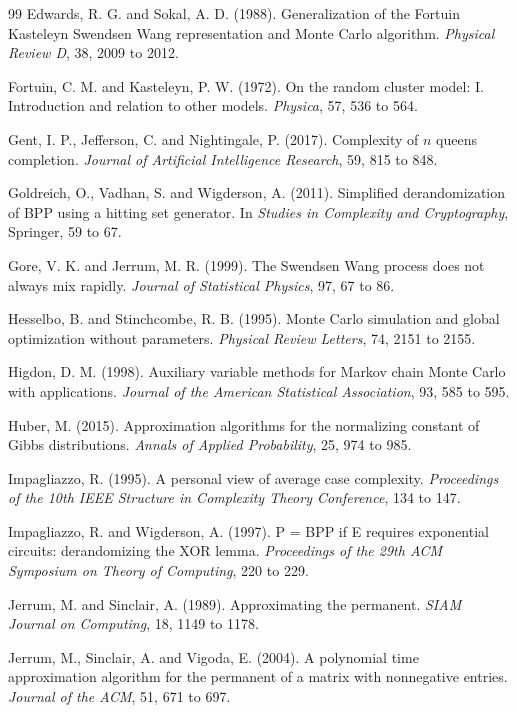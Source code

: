 \documentclass[11pt,twoside,openany]{book}
\theoremstyle{plain}
\theoremstyle{definition}
\theoremstyle{remark}
\begin{document}
\begin{thebibliography}{99}
 Edwards, R. G. and Sokal, A. D. (1988). Generalization of the Fortuin Kasteleyn Swendsen Wang representation and Monte Carlo algorithm. \emph{Physical Review D}, 38, 2009 to 2012.

 Fortuin, C. M. and Kasteleyn, P. W. (1972). On the random cluster model: I. Introduction and relation to other models. \emph{Physica}, 57, 536 to 564.

 Gent, I. P., Jefferson, C. and Nightingale, P. (2017). Complexity of $n$ queens completion. \emph{Journal of Artificial Intelligence Research}, 59, 815 to 848.

 Goldreich, O., Vadhan, S. and Wigderson, A. (2011). Simplified derandomization of BPP using a hitting set generator. In \emph{Studies in Complexity and Cryptography}, Springer, 59 to 67.

 Gore, V. K. and Jerrum, M. R. (1999). The Swendsen Wang process does not always mix rapidly. \emph{Journal of Statistical Physics}, 97, 67 to 86.

 Hesselbo, B. and Stinchcombe, R. B. (1995). Monte Carlo simulation and global optimization without parameters. \emph{Physical Review Letters}, 74, 2151 to 2155.

 Higdon, D. M. (1998). Auxiliary variable methods for Markov chain Monte Carlo with applications. \emph{Journal of the American Statistical Association}, 93, 585 to 595.

 Huber, M. (2015). Approximation algorithms for the normalizing constant of Gibbs distributions. \emph{Annals of Applied Probability}, 25, 974 to 985.

 Impagliazzo, R. (1995). A personal view of average case complexity. \emph{Proceedings of the 10th IEEE Structure in Complexity Theory Conference}, 134 to 147.

 Impagliazzo, R. and Wigderson, A. (1997). P = BPP if E requires exponential circuits: derandomizing the XOR lemma. \emph{Proceedings of the 29th ACM Symposium on Theory of Computing}, 220 to 229.

 Jerrum, M. and Sinclair, A. (1989). Approximating the permanent. \emph{SIAM Journal on Computing}, 18, 1149 to 1178.

 Jerrum, M., Sinclair, A. and Vigoda, E. (2004). A polynomial time approximation algorithm for the permanent of a matrix with nonnegative entries. \emph{Journal of the ACM}, 51, 671 to 697.


\end{thebibliography}
\end{document}
